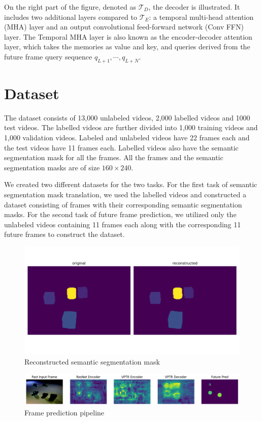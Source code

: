 \documentclass{article}
\begin{document}
On the right part of the figure, denoted as $\mathcal{T}_D$, the decoder is illustrated. It 
includes two additional layers compared to $\mathcal{T}_E$: a temporal multi-head attention 
(MHA) layer and an output convolutional feed-forward network (Conv FFN) layer. The Temporal MHA 
layer is also known as the encoder-decoder attention layer, which takes the memories as value 
and key, and queries derived from the future frame query sequence ${q_{L+1}, \cdots, q_{L+N} }$.

\section{Dataset}
The dataset consists of 13,000 unlabeled videos, 2,000 labelled videos and 1000 test videos. 
The labelled videos are further divided into 1,000 training videos and 1,000 validation videos. 
Labeled and unlabeled videos have 22 frames each and the test videos have 11 frames each.
Labelled videos also have the semantic segmentation mask for all the frames. All the frames and 
the semantic segmentation masks are of size $160 \times 240$.

We created two different datasets for the two tasks. For the first task of semantic
segmentation mask translation, we used the labelled videos and constructed a dataset consisting
of frames with their corresponding semantic segmentation masks. For the second task of future
frame prediction, we utilized only the unlabeled videos containing 11 frames each along with
the corresponding 11 future frames to construct the dataset.

\begin{figure}
  \centering
  \includegraphics[scale=0.25]{reconstructed.png}
  \caption{Reconstructed semantic segmentation mask}
  \label{fig:reconstructed}
\end{figure}

\begin{figure}
  \centering
  \includegraphics[scale=0.3]{VPTR_pipeline.png}
  \caption{Frame prediction pipeline}
  \label{fig:pipeline}
\end{figure}
\end{document}
